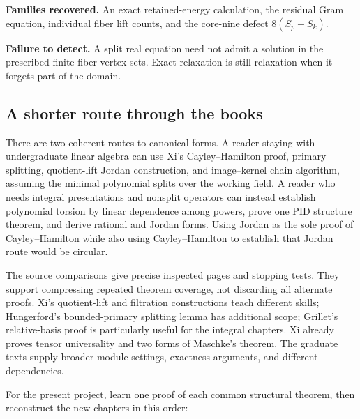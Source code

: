 \documentclass[
  11pt,
]{article}
\begin{document}
\textbf{Families recovered.} An exact retained-energy calculation, the
residual Gram equation, individual fiber lift counts, and the core-nine
defect \(8(S_p-S_k)\).

\textbf{Failure to detect.} A split real equation need not admit a
solution in the prescribed finite fiber vertex sets. Exact relaxation is
still relaxation when it forgets part of the domain.

\subsection*{A shorter route through the
books}\label{a-shorter-route-through-the-books}

There are two coherent routes to canonical forms. A reader staying with
undergraduate linear algebra can use Xi's Cayley--Hamilton proof,
primary splitting, quotient-lift Jordan construction, and image--kernel
chain algorithm, assuming the minimal polynomial splits over the working
field. A reader who needs integral presentations and nonsplit operators
can instead establish polynomial torsion by linear dependence among
powers, prove one PID structure theorem, and derive rational and Jordan
forms. Using Jordan as the sole proof of Cayley--Hamilton while also
using Cayley--Hamilton to establish that Jordan route would be circular.

The source comparisons give precise inspected pages and stopping tests.
They support compressing repeated theorem coverage, not discarding all
alternate proofs. Xi's quotient-lift and filtration constructions teach
different skills; Hungerford's bounded-primary splitting lemma has
additional scope; Grillet's relative-basis proof is particularly useful
for the integral chapters. Xi already proves tensor universality and two
forms of Maschke's theorem. The graduate texts supply broader module
settings, exactness arguments, and different dependencies.

For the present project, learn one proof of each common structural
theorem, then reconstruct the new chapters in this order:
\end{document}
